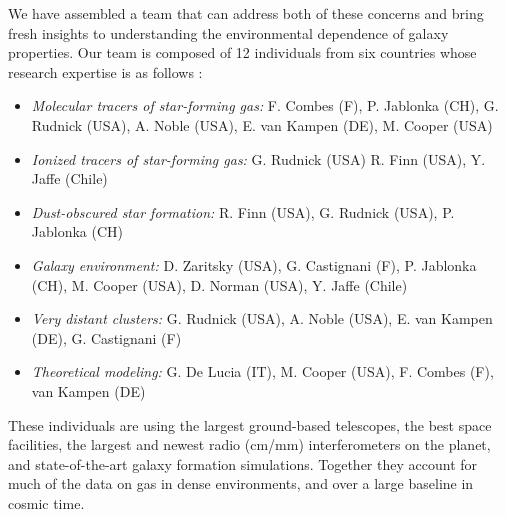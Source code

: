 \documentclass[11pt]{article}
\begin{document}
We have assembled a team that can address both of these concerns and bring fresh insights to understanding the environmental dependence of galaxy properties. Our team is composed of 12 individuals from six countries whose research expertise is as follows :
\vspace{-0.1in}
\begin{itemize} 
\item \textit{Molecular tracers of star-forming gas:} F. Combes (F), P. Jablonka (CH), G. Rudnick (USA),
A. Noble (USA), E. van Kampen (DE), M. Cooper (USA)
\vspace{-0.1in}
\item \textit{Ionized tracers of star-forming gas:} G. Rudnick (USA) R. Finn (USA), Y. Jaffe (Chile) 
\vspace{-0.1in}
\item \textit{Dust-obscured star formation:} R. Finn (USA), G. Rudnick (USA), P. Jablonka (CH)
\vspace{-0.1in}
\item \textit{Galaxy environment:} D. Zaritsky (USA), G. Castignani (F), P. Jablonka (CH), M. Cooper (USA), D. Norman (USA), Y. Jaffe (Chile)
\vspace{-0.1in}
\item \textit{Very distant clusters:} G. Rudnick (USA), A. Noble (USA), E. van Kampen (DE), G. Castignani (F) 
\vspace{-0.1in}
\item \textit{Theoretical modeling:} G. De Lucia (IT), M. Cooper (USA), F. Combes (F), van Kampen (DE)
\end{itemize}
These individuals are using the largest ground-based telescopes, the best space facilities, the largest and newest radio (cm/mm) interferometers on the planet, and state-of-the-art galaxy formation simulations.  Together they account for much of the data on gas in dense environments, and over a large baseline in cosmic time.  
\end{document}
